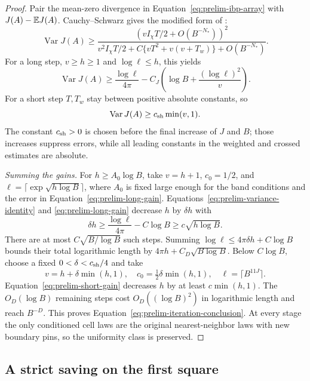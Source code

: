 \begin{proof}
Pair the mean-zero divergence in Equation~\eqref{eq:prelim-ibp-array}
with $J(A)-\mathbb E J(A)$. Cauchy--Schwarz gives the modified form of
:
\begin{equation}
 \operatorname{Var}J(A)\ge
 \frac{(vI_\chi T/2+O(B^{-N_*}))^2}
 {v^2I_\chi T/2+C\{vT^2+v(v+T_w)\}+O(B^{-N_*})}.
 \label{eq:prelim-variance-gain}
\end{equation}
For a long step, $v\ge h\ge1$ and $\log\ell\le h$, this yields
\begin{equation}
 \operatorname{Var}J(A)\ge\frac{\log\ell}{4\pi}
 -C_J\left(\log B+\frac{(\log\ell)^2}{v}\right).
 \label{eq:prelim-long-gain}
\end{equation}
For a short step $T,T_w$ stay between positive absolute constants, so
\begin{equation}
 \operatorname{Var}J(A)\ge c_{\rm sh}\min(v,1).
 \label{eq:prelim-short-gain}
\end{equation}
The constant $c_{\rm sh}>0$ is chosen before the final increase of $J$
and $B$; those increases suppress errors, while all leading constants
in the weighted and crossed estimates are absolute.

\smallskip\noindent
\emph{Summing the gains.}
For $h\ge A_0\log B$, take
$v=h+1$, $c_0=1/2$, and
$\ell=\lceil\exp\sqrt{h\log B}\rceil$, where $A_0$ is fixed large
enough for the band conditions and the error in
Equation~\eqref{eq:prelim-long-gain}. Equations~\eqref{eq:prelim-variance-identity}
and \eqref{eq:prelim-long-gain} decrease $h$ by $\delta h$ with
\[
 \delta h\ge\frac{\log\ell}{4\pi}-C\log B
 \ge c\sqrt{h\log B}.
\]
There are at most $C\sqrt{B/\log B}$ such steps. Summing
$\log\ell\le4\pi\delta h+C\log B$ bounds their total logarithmic
length by $4\pi h+C_D\sqrt{B\log B}$. Below $C\log B$, choose a
fixed $0<\delta<c_{\rm sh}/4$ and take
\[
 v=h+\delta\min(h,1),\quad c_0=\tfrac12\delta\min(h,1),\quad
 \ell=\lceil B^{11J}\rceil.
\]
Equation~\eqref{eq:prelim-short-gain} decreases $h$ by at least
$c\min(h,1)$. The $O_D(\log B)$ remaining steps cost
$O_D((\log B)^2)$ in logarithmic length and reach $B^{-D}$.
This proves Equation~\eqref{eq:prelim-iteration-conclusion}. At every
stage the only conditioned cell laws are the original nearest-neighbor
laws with new boundary pins, so the uniformity class is preserved.
\end{proof}

\subsection{A strict saving on the first square}

